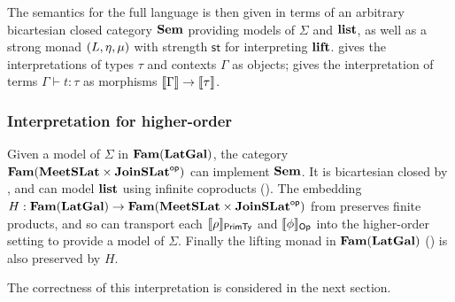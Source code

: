 The semantics for the full language is then given in terms of an arbitrary bicartesian closed category $\mathbf{Sem}$
providing models of $\Sigma$ and $\mathbf{list}$, as well as a strong monad $(L, \eta, \mu)$ with strength
$\mathsf{st}$ for interpreting $\mathbf{lift}$.  gives the interpretations of types $\tau$
and contexts $\Gamma$ as objects;  gives the interpretation of terms $\Gamma \vdash t:
\tau$ as morphisms $\llbracket \Gamma \rrbracket \to \llbracket \tau \rrbracket$.

\subsubsection{Interpretation for higher-order \GPS}

Given a model of $\Sigma$ in $\mathbf{Fam}(\mathbf{LatGal})$, the category $\mathbf{Fam}(\mathbf{MeetSLat} \times \mathbf{JoinSLat}^{\mathsf{op}})$ can
implement $\mathbf{Sem}$. It is bicartesian closed by , and can model $\mathbf{list}$ using infinite
coproducts (). The embedding $H: \mathbf{Fam}(\mathbf{LatGal}) \to
\mathbf{Fam}(\mathbf{MeetSLat} \times \mathbf{JoinSLat}^{\mathsf{op}})$ from  preserves finite products, and so can
transport each $\llbracket \rho \rrbracket_{\mathsf{PrimTy}}$ and $\llbracket \phi \rrbracket_{\mathsf{Op}}$ into the higher-order setting to provide a model
of $\Sigma$. Finally the lifting monad in $\mathbf{Fam}(\mathbf{LatGal})$ () is also preserved by
$H$. 

The correctness of this interpretation is considered in the next section.
